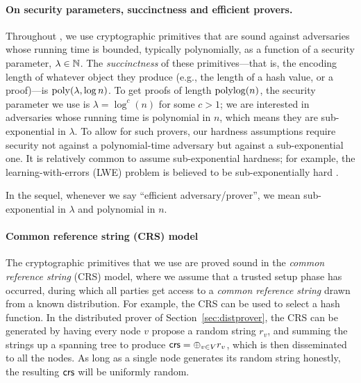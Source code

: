 \paragraph{On security parameters, succinctness and efficient provers.}
Throughout , we use cryptographic primitives
that are sound against adversaries whose running time is bounded, typically polynomially, as a function
of a security parameter, $\lambda \in \mathbb{N}$.
The \emph{succinctness} of these primitives---that is, the encoding length of whatever object they produce (e.g., the length of a hash value, or a proof)---is $\operatorname{poly}(\lambda, \log n)$.
To get proofs of length $\operatorname{polylog}(n)$, the security parameter we use is $\lambda = \log^c(n)$
for some $c > 1$;
we are interested in adversaries whose running time is polynomial in $n$,
which means they are sub-exponential in $\lambda$. %
To allow for such provers, our hardness assumptions require security not against a polynomial-time adversary
but against a sub-exponential one.
It is relatively common to assume sub-exponential hardness;
for example, the learning-with-errors (LWE) problem is believed to be sub-exponentially hard .

In the sequel, whenever we say ``efficient adversary/prover'',
we mean sub-exponential in $\lambda$ and polynomial in $n$.

\paragraph{Common reference string (CRS) model}
The cryptographic primitives that we use are proved sound in the \emph{common reference string} (CRS) model,
where we assume that a trusted setup phase has occurred, during which all parties get access to
a \emph{common reference string} drawn from a known distribution.
For example, the CRS can be used to select a hash function.
In the distributed prover of Section~\ref{sec:distprover},
the CRS can be generated by having every node $v$ propose a random string $r_v$,
and summing the strings up a spanning tree to produce $\mathsf{crs} = \oplus_{v \in V} r_v$,
which is then disseminated to all the nodes. As long as a single node generates its random string honestly, the resulting $\mathsf{crs}$
will be uniformly random.

